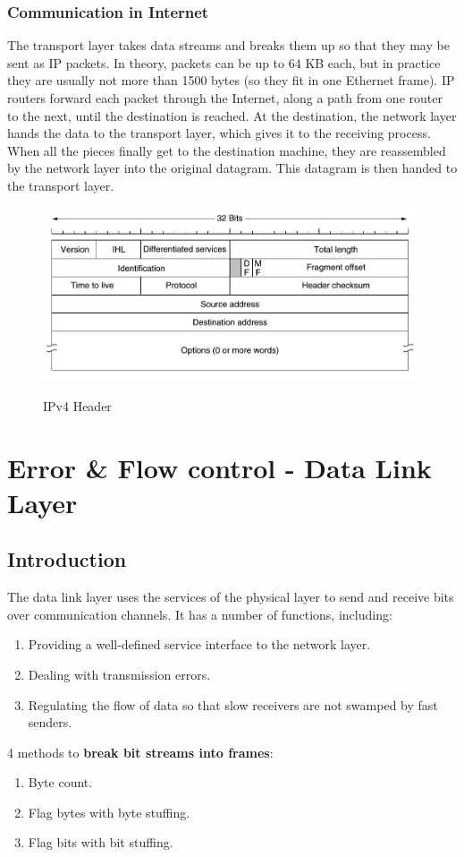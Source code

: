 \documentclass[a4paper,oneside]{book}
\begin{document}
\subsection{Communication in Internet}
 The transport layer takes data streams and breaks them up so that they may be sent as IP packets. In theory, packets can be up to 64 KB each, but in practice they are usually not more than 1500 bytes (so they fit in one Ethernet frame). IP routers forward each packet through the Internet, along a path from one router to the next, until the destination is reached. At the destination, the network layer hands the data to the transport layer, which gives it to the receiving process. When all the pieces finally get to the destination machine, they are reassembled by the network layer into the original datagram. This datagram is then handed to the transport layer.
\begin{figure}[H]
\caption{IPv4 Header}
\includegraphics[scale=0.8]{Images/ipv4header}
\label{fig:cn_ipv4}
\end{figure}
\chapter{Error \& Flow control - Data Link Layer}
\section{Introduction}
The data link layer uses the services of the physical layer to send and receive bits over communication channels. It has a number of functions, including:
\begin{enumerate}
\item Providing a well-defined service interface to the network layer.
\item Dealing with transmission errors.
\item Regulating the flow of data so that slow receivers are not swamped by fast senders.
\end{enumerate}
4 methods to \textbf{break bit streams into frames}:
\begin{enumerate}
\item Byte count.
\item Flag bytes with byte stuffing.
\item Flag bits with bit stuffing.
\end{enumerate}
\end{document}
